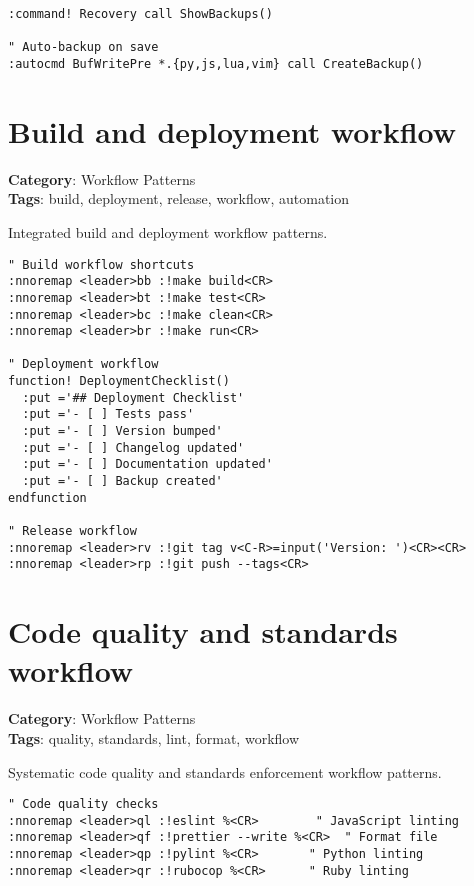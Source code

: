 {{{{{{{{{{{{{{{{{{{\begin{Exa*}{}
\begin{Verbatim}[fontsize=\footnotesize, breaklines, breakanywhere]
:command! Recovery call ShowBackups()

" Auto-backup on save
:autocmd BufWritePre *.{py,js,lua,vim} call CreateBackup()
\end{Verbatim}
\end{Exa*}

\section{Build and deployment workflow}

\textbf{Category}: Workflow Patterns\\ \textbf{Tags}: build, deployment, release, workflow, automation
\vspace{0.5cm}

Integrated build and deployment workflow patterns.

\begin{Exa*}{}
\begin{Verbatim}[fontsize=\footnotesize, breaklines, breakanywhere]
" Build workflow shortcuts
:nnoremap <leader>bb :!make build<CR>
:nnoremap <leader>bt :!make test<CR>
:nnoremap <leader>bc :!make clean<CR>
:nnoremap <leader>br :!make run<CR>

" Deployment workflow
function! DeploymentChecklist()
  :put ='## Deployment Checklist'
  :put ='- [ ] Tests pass'
  :put ='- [ ] Version bumped'
  :put ='- [ ] Changelog updated'
  :put ='- [ ] Documentation updated'
  :put ='- [ ] Backup created'
endfunction

" Release workflow
:nnoremap <leader>rv :!git tag v<C-R>=input('Version: ')<CR><CR>
:nnoremap <leader>rp :!git push --tags<CR>
\end{Verbatim}
\end{Exa*}

\section{Code quality and standards workflow}

\textbf{Category}: Workflow Patterns\\ \textbf{Tags}: quality, standards, lint, format, workflow
\vspace{0.5cm}

Systematic code quality and standards enforcement workflow patterns.

\begin{Exa*}{}
\begin{Verbatim}[fontsize=\footnotesize, breaklines, breakanywhere]
" Code quality checks
:nnoremap <leader>ql :!eslint %<CR>        " JavaScript linting
:nnoremap <leader>qf :!prettier --write %<CR>  " Format file
:nnoremap <leader>qp :!pylint %<CR>       " Python linting
:nnoremap <leader>qr :!rubocop %<CR>      " Ruby linting


\end{Verbatim}
\end{Exa*}}}}}}}}}}}}}}}}}}}}
